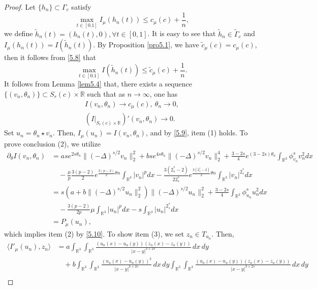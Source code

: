 \documentclass[11pt]{article}
\numberwithin{equation}{section}
\begin{document}
\begin{proof}
Let $\{h_n\}\subset \Gamma_c$ satisfy 
\begin{equation}\label{5.8}
\max_{t\in[0.1]}I_\mu(h_n(t))\leq {c}_\mu(c)+\frac{1}{n},
\end{equation}
we define $\tilde{h}_n(t)=(h_n(t) , 0), \forall t\in[0,1]$. 
It is easy to see that $\tilde{h}_n \in \tilde{\Gamma}_c$ and 
$I_\mu(h_n(t))=I(\tilde{h}_n(t))$. By Proposition \ref{pro5.1}, we have 
$\tilde{c}_\mu(c)={c}_\mu(c)$, then it follows from \eqref{5.8} that
\[  %
\max_{t\in[0.1]}I(\tilde{h}_n(t))\leq \tilde{c}_\mu(c)+\frac{1}{n}.
\]
It follows from Lemma \ref{lem5.4} that, there exists a sequence
$\{(v_n, \theta_n)\} \subset S_{r}(c)\times \mathbb{R}$ such that as $n\to \infty$,
one has
\begin{gather}\label{5.9}
I(v_n, \theta_n)\to c_\mu(c), ~\theta_n\to 0, \\
\label{5.10}
(I|_{S_{r}(c)\times{\mathbb{R}}})'(v_n, \theta_n)\to 0.
\end{gather}
Set $u_n=\theta_n \star  v_n$. Then, $I_\mu(u_n)=I(v_n, \theta_n)$,
and by \eqref{5.9}, item (1) holds.  To prove conclusion (2), we utilize
\begin{align*}%
\partial_\theta I(v_n, \theta_n)
&= ase^{2s\theta_n}\|(-\Delta)^{s/2}v_n\|^2_2+bse^{4s\theta_n}\|(-\Delta)^{s/2}v_n\|^4_2+\frac{3-2s}{4}e^{(3-2s)\theta_n}
\int_{\mathbb{R}^3}\phi^s_{v_n}{v^2_n}dx\\
&\quad -\frac{\mu}{p}\frac{3(p-2)}{2}e^{\frac{3(p-2)}{2}\theta n}\int_{\mathbb{R}^3}|v_n|^pdx-\frac{3(2^*_s-2)}{2 2^*_s}e^{\frac{3(2^*_s-2)}{2}\theta n}\int_{\mathbb{R}^3}|v_n|^{2^*_s}dx\\
&= s(a+b\|(-\Delta)^{s/2}u_n\|^2_2)\|(-\Delta)^{s/2}u_n\|^2_2+\frac{3-2s}{4}\int_{\mathbb{R}^3}\phi^s_{u_n}{u^2_n}dx\\
&\quad -\frac{3(p-2)}{2p}\mu \int_{\mathbb{R}^3}|u_n|^pdx-s\int_{\mathbb{R}^3}|u_n|^{2^*_s}dx\\
&= P_\mu(u_n),
\end{align*}
which implies item (2) by \eqref{5.10}. To show item (3), we set $z_n\in T_{u_n}$.
Then,
\begin{align*}%
\langle I'_\mu(u_n),z_n\rangle
&= a\int_{\mathbb{R}^3}\int_{\mathbb{R}^3}
 \frac{(u_n(x)-u_n(y))(z_n(x)-z_n(y))}{|x-y|^{3+2s}}\,dx\,dy\\
&\quad +b\int_{\mathbb{R}^3}\int_{\mathbb{R}^3}\frac{(u_n(x)
 -u_n(y))^2}{|x-y|^{3+2s}}\,dx\,dy
 \int_{\mathbb{R}^3}\int_{\mathbb{R}^3}
 \frac{(u_n(x)-u_n(y))(z_n(x)-z_n(y))}{|x-y|^{3+2s}}\,dx\,dy  \\

\end{align*}
\end{proof}
\end{document}
